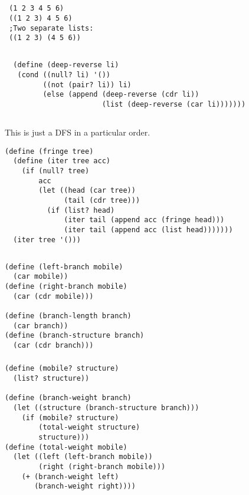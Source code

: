 \documentclass{article}
\begin{document}
\subsection{}
\begin{verbatim}
 (1 2 3 4 5 6)
 ((1 2 3) 4 5 6)
 ;Two separate lists:
 ((1 2 3) (4 5 6))
\end{verbatim}
 
\subsection{}
\begin{verbatim}
  (define (deep-reverse li) 
   (cond ((null? li) '()) 
         ((not (pair? li)) li) 
         (else (append (deep-reverse (cdr li))  
                       (list (deep-reverse (car li))))))) 
 \end{verbatim}
 
\subsection{}
This is just a DFS in a particular order.
\begin{verbatim}
(define (fringe tree)
  (define (iter tree acc)
    (if (null? tree)
        acc
        (let ((head (car tree))
              (tail (cdr tree)))
          (if (list? head)
              (iter tail (append acc (fringe head)))
              (iter tail (append acc (list head)))))))
  (iter tree '()))
\end{verbatim}

\subsection{}
\subsubsection{}
\begin{verbatim}
(define (left-branch mobile)
  (car mobile))
(define (right-branch mobile)
  (car (cdr mobile)))

(define (branch-length branch)
  (car branch))
(define (branch-structure branch)
  (car (cdr branch)))
\end{verbatim}

\subsubsection{}
\begin{verbatim}
(define (mobile? structure)
  (list? structure))
  
(define (branch-weight branch)
  (let ((structure (branch-structure branch)))
    (if (mobile? structure)
        (total-weight structure)
        structure)))
(define (total-weight mobile)
  (let ((left (left-branch mobile))
        (right (right-branch mobile)))
    (+ (branch-weight left)
       (branch-weight right))))
       \end{verbatim}
\end{document}

